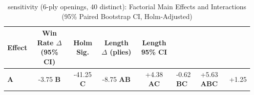 \begin{table}[htbp]
\centering
\caption{sensitivity (6-ply openings, 40 distinct): Factorial Main Effects and Interactions (95\% Paired Bootstrap CI, Holm-Adjusted)}
\label{tab:factorial_effects}
\begin{tabular}{lcccc}
\toprule
Effect & Win Rate $\Delta$ (95\% CI) & Holm Sig. & Length $\Delta$ (plies) & Length 95\% CI \\
\midrule
\textbf{A} & -3.75%
\textbf{B} & -41.25%
\textbf{C} & -8.75%
\textbf{AB} & +4.38%
\textbf{AC} & -0.62%
\textbf{BC} & +5.63%
\textbf{ABC} & +1.25%
\bottomrule
\end{tabular}
\end{table}
